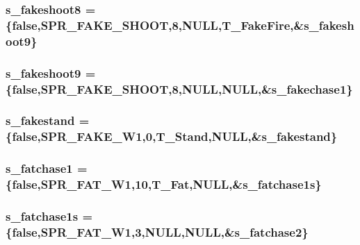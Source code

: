 \label{WL__ACT2_8C_a7a10174c868f49b0c325e88f823b82e7}
\hypertarget{WL__ACT2_8C_a3a7d13b4222a3a03167499edde47b16d}{
\subsubsection[{s\_\-fakeshoot8}]{ {\bf s\_\-fakeshoot8} = \{false,SPR\_\-FAKE\_\-SHOOT,8,NULL,T\_\-FakeFire,\&{\bf s\_\-fakeshoot9}\}}}
\label{WL__ACT2_8C_a3a7d13b4222a3a03167499edde47b16d}
\hypertarget{WL__ACT2_8C_ab57feb5d0874f2fb4e5dc691a3573880}{
\subsubsection[{s\_\-fakeshoot9}]{ {\bf s\_\-fakeshoot9} = \{false,SPR\_\-FAKE\_\-SHOOT,8,NULL,NULL,\&{\bf s\_\-fakechase1}\}}}
\label{WL__ACT2_8C_ab57feb5d0874f2fb4e5dc691a3573880}
\hypertarget{WL__ACT2_8C_a2fab5217bda18756fcaba79670217a38}{
\subsubsection[{s\_\-fakestand}]{ {\bf s\_\-fakestand} = \{false,SPR\_\-FAKE\_\-W1,0,T\_\-Stand,NULL,\&{\bf s\_\-fakestand}\}}}
\label{WL__ACT2_8C_a2fab5217bda18756fcaba79670217a38}
\hypertarget{WL__ACT2_8C_a7a5bc05a28fc2d5353459a65f27de274}{
\subsubsection[{s\_\-fatchase1}]{ {\bf s\_\-fatchase1} = \{false,SPR\_\-FAT\_\-W1,10,T\_\-Fat,NULL,\&{\bf s\_\-fatchase1s}\}}}
\label{WL__ACT2_8C_a7a5bc05a28fc2d5353459a65f27de274}
\hypertarget{WL__ACT2_8C_a5340eb27beeb3b953fdfb07c6edb204a}{
\subsubsection[{s\_\-fatchase1s}]{ {\bf s\_\-fatchase1s} = \{false,SPR\_\-FAT\_\-W1,3,NULL,NULL,\&{\bf s\_\-fatchase2}\}}}
